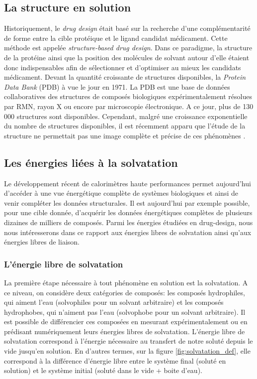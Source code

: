 \subsection{La structure en solution}
Historiquement, le \textit{drug design} était basé sur la recherche d'une complémentarité de forme entre la cible protéique et le ligand candidat médicament. Cette méthode est appelée \textit{structure-based drug design}\cite{Anderson_process_2003,Zhang_towards_2011,Agrawal_structure_2013}. Dans ce paradigme, la structure de la protéine ainsi que la position des molécules de solvant autour d'elle étaient donc indispensables afin de sélectionner et d'optimiser au mieux les candidats médicament. Devant la quantité croissante de structures disponibles, la \textit{Protein Data Bank}\cite{Bruno_crystallography_2017, Berman_protein_2000} (PDB) à vue le jour en 1971. La PDB est une base de données collaboratives des structures de composés biologiques expérimentalement résolues par RMN\cite{Montelione_recommendations_2013}, rayon X\cite{Read_new_2011} ou encore par microscopie électronique\cite{Henderson_outcome_2012}. A ce jour, plus de 130 000 structures sont disponibles. Cependant, malgré une croissance exponentielle du nombre de structures disponibles, il est récemment apparu que l'étude de la structure ne permettait pas une image complète et précise de ces phénomènes \cite{Henry_structure_2001}. 


\subsection{Les énergies liées à la solvatation}
Le développement récent de calorimètres haute performances permet aujourd'hui d'accéder à une vue énergétique complète de systèmes biologiques\cite{Chaires_Calorimetry_2008, Garbett_thermodynamic_2012, Klebe_applying_2015} et ainsi de venir compléter les données structurales. Il est aujourd'hui par exemple possible, pour une cible donnée, d'acquérir les données énergétiques complètes de plusieurs dizaines de milliers de composés. Parmi les énergies étudiées en drug-design, nous nous intéresserons dans ce rapport aux énergies libres de solvatation ainsi qu'aux énergies libres de liaison.

\subsubsection{L'énergie libre de solvatation}
La première étape nécessaire à tout phénomène en solution est la solvatation. A ce niveau, on considère deux catégories de composés: les composés hydrophiles, qui aiment l'eau (solvophiles pour un solvant arbitraire) et les composés hydrophobes, qui n'aiment pas l'eau (solvophobe pour un solvant arbitraire). Il est possible de différencier ces composées en mesurant expérimentalement ou en prédisant numériquement leurs énergies libres de solvatation. L'énergie libre de solvatation correspond à l'énergie nécessaire au transfert de notre soluté depuis le vide jusqu'en solution. En d'autres termes, sur la figure \ref{fig:solvatation_def}, elle correspond à la différence d'énergie libre entre le système final (soluté en solution) et le système initial (soluté dans le vide + boite d'eau). 


